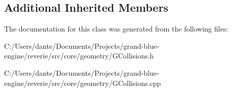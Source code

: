 \subsection*{Additional Inherited Members}


The documentation for this class was generated from the following files\+:\begin{DoxyCompactItemize}
\item 
C\+:/\+Users/dante/\+Documents/\+Projects/grand-\/blue-\/engine/reverie/src/core/geometry/G\+Collisions.\+h\item 
C\+:/\+Users/dante/\+Documents/\+Projects/grand-\/blue-\/engine/reverie/src/core/geometry/G\+Collisions.\+cpp\end{DoxyCompactItemize}
